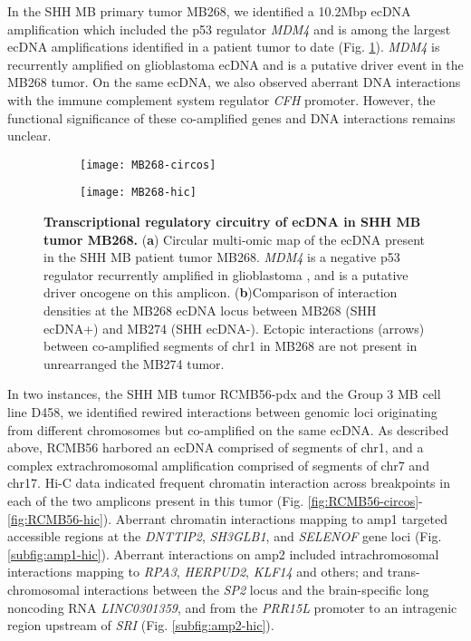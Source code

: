 In the SHH MB primary tumor MB268, we identified a 10.2Mbp ecDNA amplification which included the p53 regulator \textit{MDM4} \cite{toledo_2007} and is among the largest ecDNA amplifications identified in a patient tumor to date (Fig. \ref{fig:MB268}). \textit{MDM4} is recurrently amplified on glioblastoma ecDNA \cite{AA} and is a putative driver event in the MB268 tumor. On the same ecDNA, we also observed aberrant DNA interactions with the immune complement system regulator \textit{CFH} promoter. However, the functional significance of these co-amplified genes and DNA interactions remains unclear. 

\begin{figure}[!h]
    \centering
    \begin{subfigure}{.49\textwidth}
        \texttt{[image: MB268-circos]}
    \end{subfigure}
    \begin{subfigure}{.49\textwidth}
        \texttt{[image: MB268-hic]}
    \end{subfigure}
    \caption[Transcriptional regulatory circuitry of ecDNA in SHH MB tumor MB268.]{\textbf{Transcriptional regulatory circuitry of ecDNA in SHH MB tumor MB268.} (\textbf{a}) Circular multi-omic map of the ecDNA present in the SHH MB patient tumor MB268. \textit{MDM4} is a negative p53 regulator recurrently amplified in glioblastoma \cite{AA}, and is a putative driver oncogene on this amplicon. (\textbf{b})Comparison of interaction densities at the MB268 ecDNA locus between MB268 (SHH ecDNA+) and MB274 (SHH ecDNA-). Ectopic interactions (arrows) between co-amplified segments of chr1 in MB268 are not present in unrearranged the MB274 tumor.
    }
    \label{fig:MB268}
\end{figure}

\par In two instances, the SHH MB tumor RCMB56-pdx and the Group 3 MB cell line D458, we identified rewired interactions between genomic loci originating from different chromosomes but co-amplified on the same ecDNA. As described above, RCMB56 harbored an ecDNA comprised of segments of chr1, and a complex extrachromosomal amplification comprised of segments of chr7 and chr17. Hi-C data indicated frequent chromatin interaction across breakpoints in each of the two amplicons present in this tumor (Fig. \ref{fig:RCMB56-circos}-\ref{fig:RCMB56-hic}). Aberrant chromatin interactions mapping to amp1 targeted accessible regions at the \textit{DNTTIP2}, \textit{SH3GLB1}, and \textit{SELENOF} gene loci (Fig. \ref{subfig:amp1-hic}). Aberrant interactions on amp2 included intrachromosomal interactions mapping to \textit{RPA3}, \textit{HERPUD2}, \textit{KLF14} and others; and trans-chromosomal interactions between the \textit{SP2} locus and the brain-specific long noncoding RNA \textit{LINC0301359}, and from the \textit{PRR15L} promoter to an intragenic region upstream of \textit{SRI} (Fig. \ref{subfig:amp2-hic}). 

